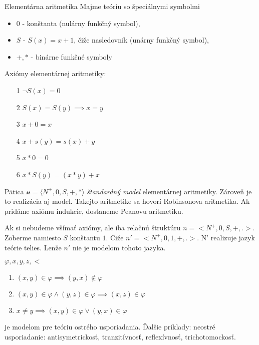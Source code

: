 \begin{priklad}{Elementárna aritmetika}
    Majme teóriu so špeciálnymi symbolmi
    \begin{itemize}
        \item $0$ - konštanta (nulárny funkčný symbol),
        \item $S$ - $S(x)=x+1$, čiže nasledovník (unárny funkčný symbol),
        \item $+,*$ - binárne funkčné symboly
    \end{itemize}
    Axiómy elementárnej aritmetiky:
    \begin{itemize}
        \item[1] $\neg S(x) = 0$
        \item[2] $S(x) = S(y) \implies x=y$
        \item[3] $x+0 = x$
        \item[4] $x+s(y) = s(x) + y$
        \item[5] $x * 0 = 0$
        \item[6] $x * S(y) = (x*y)+x$
    \end{itemize}
    Pätica  $\mathcal{n}=\langle N^+,0,S,+,* \rangle$ \emph{štandardný model}
    elementárnej aritmetiky. Zároveň je to realizácia aj model. 
    Takejto aritmetike sa hovorí Robinsonova aritmetika.
    Ak pridáme axiómu indukcie, dostaneme Peanovu aritmetiku.
\end{priklad}

\begin{poznamka}
    Ak si nebudeme všímať axiómy, ale iba relačnú štruktúru
    $n=<N^+,0,S,+,.>$. Zoberme namiesto $S$ konštantu $1$.
    Ciže $n'=<N^+,0,1,+,.>$. N' realizuje jazyk teórie telies.
    Lenže $n'$ nie je modelom tohoto jazyka. 
\end{poznamka}

\begin{priklad}[Usporiadania]
    $\varphi, x, y, z, <$
    \begin{enumerate}
        \item $(x,y) \in \varphi  \implies (y,x) \notin  \varphi$
        \item $(x,y) \in \varphi \land (y,z) \in \varphi \implies (x,z) \in \varphi$
        \item $x \neq y \implies (x,y) \in \varphi \lor (y,x) \in \varphi$
    \end{enumerate}

    je modelom pre teóriu ostrého usporiadania.
    Ďalšie príklady: neostré usporiadanie: antisymetrickosť, tranzitívnosť,
    reflexívnosť, trichotomockosť.
\end{priklad}


